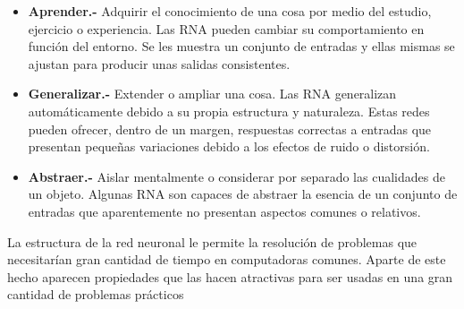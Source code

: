 \documentclass[12pt,letterpaper,titlepage]{article}
\begin{document}
\begin{itemize}
\begin{itemize}\itemsep=0pt
\item  \textbf{Aprender.-} Adquirir el conocimiento de una cosa por medio del estudio, ejercicio
o experiencia. Las RNA pueden cambiar su comportamiento en función del entorno. Se
les muestra un conjunto de entradas y ellas mismas se ajustan para producir unas salidas
consistentes.
\item  \textbf{Generalizar.-} Extender o ampliar una cosa. Las RNA generalizan
automáticamente debido a su propia estructura y naturaleza. Estas redes pueden ofrecer,
dentro de un margen, respuestas correctas a entradas que presentan pequeñas
variaciones debido a los efectos de ruido o distorsión.
\item  \textbf{Abstraer.-} Aislar mentalmente o considerar por separado las cualidades de un
objeto. Algunas RNA son capaces de abstraer la esencia de un conjunto de entradas que
aparentemente no presentan aspectos comunes o relativos.
\end{itemize}

%
%
%
%
%

La estructura de la red neuronal le permite la resolución de problemas que necesitarían gran cantidad de tiempo en computadoras comunes. Aparte de este hecho aparecen propiedades que las hacen atractivas para ser usadas en una gran cantidad de problemas prácticos \cite{125}


\end{itemize}
\end{document}
